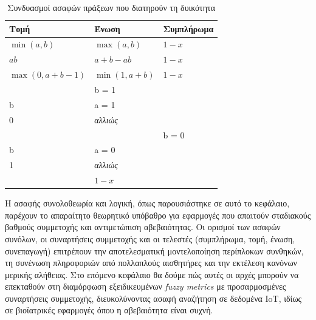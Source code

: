 \begin{table}[h!]
    \centering
    \begin{tabularx}{\textwidth}{X X X}
        \textbf{Τομή} & \textbf{Ένωση} & \textbf{Συμπλήρωμα} \\
        \hline
         \rule{0pt}{3ex}\(\min(a,b)\) & \(\max(a,b)\) & \(1-x\) \\
         \rule{0pt}{3ex}\(ab\) & \(a + b - ab\) & \(1-x\) \\
         \rule{0pt}{3ex}\(\max(0, a+b-1)\) & \(\min(1, a + b)\) & \(1-x\) \\
         \rule{0pt}{5ex}\(\left\{
            \begin{array}{ll}
                  a & b = 1 \\
                  b & a = 1 \\
                  0 & \textit{αλλιώς}\\
            \end{array} 
            \right.\) & \(\left\{
            \begin{array}{ll}
                  a & b = 0 \\
                  b & a = 0 \\
                  1 & \textit{αλλιώς}\\
            \end{array} 
            \right.\) & \(1-x\)
    \end{tabularx}
    \caption{Συνδυασμοί ασαφών πράξεων που διατηρούν τη δυικότητα}
    \label{tab:comb}
\end{table}

  Η ασαφής συνολοθεωρία και λογική, όπως παρουσιάστηκε σε αυτό το κεφάλαιο, παρέχουν το απαραίτητο θεωρητικό υπόβαθρο για εφαρμογές που απαιτούν σταδιακούς βαθμούς συμμετοχής και αντιμετώπιση αβεβαιότητας.
  Οι ορισμοί των ασαφών συνόλων, οι συναρτήσεις συμμετοχής και οι τελεστές (συμπλήρωμα, τομή, ένωση, συνεπαγωγή) επιτρέπουν την αποτελεσματική μοντελοποίηση περίπλοκων συνθηκών,
  τη συνένωση πληροφοριών από πολλαπλούς αισθητήρες και την εκτέλεση κανόνων μερικής αλήθειας. 
  Στο επόμενο κεφάλαιο θα δούμε πώς αυτές οι αρχές μπορούν να επεκταθούν στη διαμόρφωση εξειδικευμένων \emph{\textlatin{fuzzy metrics}} με προσαρμοσμένες συναρτήσεις συμμετοχής,
  διευκολύνοντας ασαφή αναζήτηση σε δεδομένα \textlatin{IoT}, ιδίως σε βιοϊατρικές εφαρμογές όπου η αβεβαιότητα είναι συχνή.